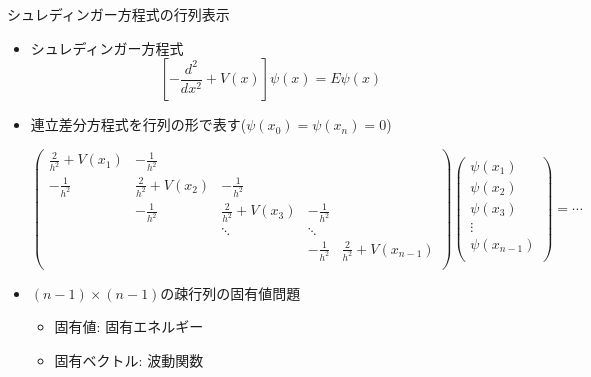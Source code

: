\begin{frame}[t,fragile]{シュレディンガー方程式の行列表示}
  \begin{itemize}
  \item シュレディンガー方程式
    \[
    [-\frac{d^2}{dx^2}+V(x)]\psi(x) = E \psi(x)
    \]
  \item 連立差分方程式を行列の形で表す($\psi(x_0)=\psi(x_n)=0$)
    \begin{footnotesize}
    \[
    \begin{pmatrix}
      \frac{2}{h^2}+V(x_1) & -\frac{1}{h^2} \\
      -\frac{1}{h^2} & \frac{2}{h^2}+V(x_2) & -\frac{1}{h^2} \\
      & -\frac{1}{h^2} & \frac{2}{h^2}+V(x_3) & -\frac{1}{h^2} \\
      & & \ddots & \ddots \\
      & & & -\frac{1}{h^2} & \frac{2}{h^2}+V(x_{n-1}) \\
    \end{pmatrix}
    \begin{pmatrix}
      \psi(x_1) \\
      \psi(x_2) \\
      \psi(x_3) \\
      \vdots \\
      \psi(x_{n-1}) \\
    \end{pmatrix}
    = \cdots %
    \]
    \end{footnotesize}
  \item $(n-1) \times (n-1)$の疎行列の固有値問題
    \begin{itemize}
    \item 固有値: 固有エネルギー
    \item 固有ベクトル: 波動関数
    \end{itemize}
  \end{itemize}
\end{frame}

